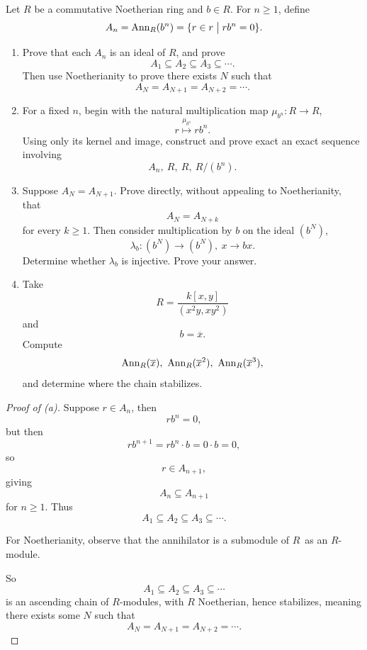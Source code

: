 \documentclass[11pt]{article}
\begin{document}
\begin{prob}
    Let $R$ be a commutative Noetherian ring 
    and $b \in R$. 
    For $n \geq 1$, define 
    \[
        A_n = \operatorname{Ann}_R(b^n) = \{r \in r \bigm| rb^n = 0\}. 
    \]

    \begin{enumerate}[label=(\alph*)]
        \item Prove that each $A_n$ is an ideal of $R$, and prove 
            \[
                A_1 \subseteq A_2 \subseteq A_3 \subseteq 
                \cdots.
            \]
            Then use Noetherianity to prove there exists 
            $N$ such that 
            \[
                A_N = A_{N+1} = A_{N+2} = \cdots. 
            \]
        \item For a fixed $n$, begin with the natural 
            multiplication map $\mu_{b^n} : R \to R$, 
            \[
                r \overset{\mu_{b^n}}\mapsto rb^n.
            \]
            Using only its kernel and image, construct and 
            prove exact an exact sequence involving 
            \[
                A_n, \ R, \ R, \ R/(b^n).
            \]

        \item Suppose $A_N = A_{N+1}$. 
            Prove directly, without appealing to 
            Noetherianity, that 
            \[
                A_N = A_{N+k}
            \]
            for every $k \geq 1$. 
            Then consider multiplication by $b$ on the ideal 
            $(b^N)$, 
            \[
                \lambda_b : (b^N) \to (b^N), \ x \to bx. 
            \]
            Determine whether $\lambda_b$ is injective. 
            Prove your answer. 

        \item Take 
            \[
                R=\frac{k[x,y]}{(x^2y,xy^2)}           
            \]
            and 
            \[
                b = \overline x.
            \]
            Compute 
            \[
                \Ann_R(\overline x), \ \Ann_R(\overline x^2), 
                \ \Ann_R(\overline x^3), 
            \]
            and determine where the chain stabilizes. 

    \end{enumerate}
\end{prob}
\begin{proof}[Proof of (a)]
    Suppose $r \in A_n$, then 
    \[
        rb^n = 0, 
    \]
    but then 
    \[
        rb^{n+1} = rb^n \cdot b = 0 \cdot b = 0, 
    \]
    so 
    \[
        r \in A_{n+1}, 
    \]
    giving 
    \[
        A_n \subseteq A_{n+1}  
    \]
    for $n \geq 1$. 
    Thus 
    \[
        A_1 \subseteq A_2 \subseteq A_3 \subseteq \cdots. 
    \]

    For Noetherianity, observe that the annihilator 
    is a submodule of 
    $R$ as an $R$-module. 

    So 
    \[
        A_1 \subseteq A_2 \subseteq A_3 \subseteq \cdots 
    \]
    is an ascending chain of $R$-modules, with $R$ Noetherian, 
    hence stabilizes, meaning 
    there exists some $N$ such that 
    \[
        A_N = A_{N+1} = A_{N+2} = \cdots. 
    \]
\end{proof}
\end{document}
